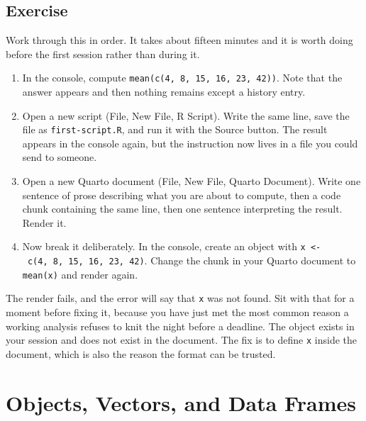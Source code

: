 \documentclass[
  a4paper,
]{scrbook}
\begin{document}
\section*{Exercise}\label{exercise}


Work through this in order. It takes about fifteen minutes and it is
worth doing before the first session rather than during it.

\begin{enumerate}
\def\labelenumi{\arabic{enumi}.}
\item
  In the console, compute \texttt{mean(c(4,\ 8,\ 15,\ 16,\ 23,\ 42))}.
  Note that the answer appears and then nothing remains except a history
  entry.
\item
  Open a new script (File, New File, R Script). Write the same line,
  save the file as \texttt{first-script.R}, and run it with the Source
  button. The result appears in the console again, but the instruction
  now lives in a file you could send to someone.
\item
  Open a new Quarto document (File, New File, Quarto Document). Write
  one sentence of prose describing what you are about to compute, then a
  code chunk containing the same line, then one sentence interpreting
  the result. Render it.
\item
  Now break it deliberately. In the console, create an object with
  \texttt{x\ \textless{}-\ c(4,\ 8,\ 15,\ 16,\ 23,\ 42)}. Change the
  chunk in your Quarto document to \texttt{mean(x)} and render again.
\end{enumerate}

The render fails, and the error will say that \texttt{x} was not found.
Sit with that for a moment before fixing it, because you have just met
the most common reason a working analysis refuses to knit the night
before a deadline. The object exists in your session and does not exist
in the document. The fix is to define \texttt{x} inside the document,
which is also the reason the format can be trusted.

\chapter*{Objects, Vectors, and Data
Frames}\label{objects-vectors-and-data-frames}

\end{document}

